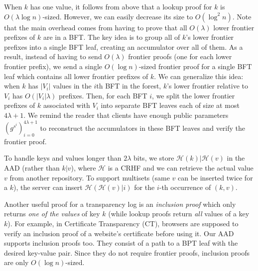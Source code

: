 When $k$ has one value, it follows from above that a lookup proof for $k$ is $O(\lambda \log{n})$-sized.
However, we can easily decrease its size to $O(\log^2{n})$.
Note that the main overhead comes from having to prove that all $O(\lambda)$ lower frontier prefixes of $k$ are in a BFT.
The key idea is to group all of $k$'s lower frontier prefixes into a single BFT leaf, creating an accumulator over all of them.
As a result, instead of having to send $O(\lambda)$ frontier proofs (one for each lower frontier prefix), we send a single $O(\log{n})$-sized frontier proof for a single BFT leaf which contains all lower frontier prefixes of $k$.
We can generalize this idea: when $k$ has $|V_i|$ values in the $i$th BFT in the forest, $k$'s lower frontier relative to $V_i$ has $O(|V_i|\lambda)$ prefixes.
Then, for each BFT $i$, we split the lower frontier prefixes of $k$ associated with $V_i$ into separate BFT leaves each of size at most $4\lambda + 1$.
We remind the reader that clients have enough public parameters  $(g^{s^i})_{i=0}^{4\lambda+1}$ to reconstruct the accumulators in these BFT leaves and verify the frontier proof.

To handle keys and values longer than $2\lambda$ bits, we store $\mathcal{H}(k)|\mathcal{H}(v)$ in the AAD (rather than $k|v$), where $\mathcal{H}$ is a CRHF and we can retrieve the actual value $v$ from another repository.
To support multisets (same $v$ can be inserted twice for a $k$), the server can insert $\mathcal{H}(\mathcal{H}(v)|i)$ for the $i$-th occurrence of $(k,v)$.

Another useful proof for a transparency log is an \textit{inclusion proof} which only returns \textit{one of the values} of key $k$ (while lookup proofs return \textit{all} values of a key $k$).
For example, in Certificate Transparency (CT), browsers are supposed to verify an inclusion proof of a website's certificate before using it.
Our AAD supports inclusion proofs too.
They consist of a path to a BPT leaf with the desired key-value pair.
Since they do not require frontier proofs, inclusion proofs are only $O(\log{n})$-sized.